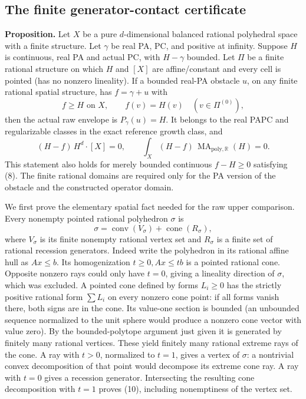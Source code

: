 \documentclass[
  10pt,
]{article}
\begin{document}
\subsection{The finite generator-contact
certificate}\label{the-finite-generator-contact-certificate}

\textbf{Proposition.} Let \(X\) be a pure \(d\)-dimensional balanced
rational polyhedral space with a finite structure. Let \(\gamma\) be
real PA, PC, and positive at infinity. Suppose \(H\) is continuous, real
PA and actual PC, with \(H-\gamma\) bounded. Let \(\Pi\) be a finite
rational structure on which \(H\) and \([X]\) are affine/constant and
every cell is pointed (has no nonzero lineality). If a bounded real-PA
obstacle \(u\), on any finite rational spatial structure, has
\(f=\gamma+u\) with \[
 f\geq H\text{ on }X,\qquad f(v)=H(v)\quad(v\in\Pi^{(0)}),       \tag{8}
\] then the actual raw envelope is \(P_\gamma(u)=H\). It belongs to the
real PAPC and regularizable classes in the exact reference growth class,
and \[
 (H-f)\,H^d\cdot[X]=0,\qquad\int_X(H-f)\,\operatorname{MA}_{\mathrm{poly},\mathbb R}(H)=0. \tag{9}
\] This statement also holds for merely bounded continuous \(f-H\geq0\)
satisfying (8). The finite rational domains are required only for the PA
version of the obstacle and the constructed operator domain.

We first prove the elementary spatial fact needed for the raw upper
comparison. Every nonempty pointed rational polyhedron \(\sigma\) is \[
 \sigma=\operatorname{conv}(V_\sigma)+\operatorname{cone}(R_\sigma), \tag{10}
\] where \(V_\sigma\) is its finite nonempty rational vertex set and
\(R_\sigma\) is a finite set of rational recession generators. Indeed
write the polyhedron in its rational affine hull as \(Ax\leq b\). Its
homogenization \(t\geq0, Ax\leq tb\) is a pointed rational cone.
Opposite nonzero rays could only have \(t=0\), giving a lineality
direction of \(\sigma\), which was excluded. A pointed cone defined by
forms \(L_i\geq0\) has the strictly positive rational form \(\sum L_i\)
on every nonzero cone point: if all forms vanish there, both signs are
in the cone. Its value-one section is bounded (an unbounded sequence
normalized to the unit sphere would produce a nonzero cone vector with
value zero). By the bounded-polytope argument just given it is generated
by finitely many rational vertices. These yield finitely many rational
extreme rays of the cone. A ray with \(t>0\), normalized to \(t=1\),
gives a vertex of \(\sigma\): a nontrivial convex decomposition of that
point would decompose its extreme cone ray. A ray with \(t=0\) gives a
recession generator. Intersecting the resulting cone decomposition with
\(t=1\) proves (10), including nonemptiness of the vertex set.
\end{document}

